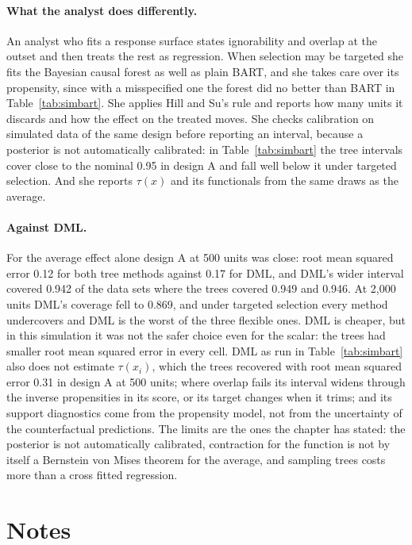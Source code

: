 \paragraph{What the analyst does differently.} An analyst who fits a response surface states ignorability and overlap at the outset and then treats the rest as regression. When selection may be targeted she fits the Bayesian causal forest as well as plain BART, and she takes care over its propensity, since with a misspecified one the forest did no better than BART in Table~\ref{tab:simbart}. She applies Hill and Su's rule and reports how many units it discards and how the effect on the treated moves. She checks calibration on simulated data of the same design before reporting an interval, because a posterior is not automatically calibrated: in Table~\ref{tab:simbart} the tree intervals cover close to the nominal 0.95 in design A and fall well below it under targeted selection. And she reports $\tau(x)$ and its functionals from the same draws as the average.

\paragraph{Against DML.} For the average effect alone design A at 500 units was close: root mean squared error 0.12 for both tree methods against 0.17 for DML, and DML's wider interval covered 0.942 of the data sets where the trees covered 0.949 and 0.946. At 2,000 units DML's coverage fell to 0.869, and under targeted selection every method undercovers and DML is the worst of the three flexible ones. DML is cheaper, but in this simulation it was not the safer choice even for the scalar: the trees had smaller root mean squared error in every cell. DML as run in Table~\ref{tab:simbart} also does not estimate $\tau(x_i)$, which the trees recovered with root mean squared error 0.31 in design A at 500 units; where overlap fails its interval widens through the inverse propensities in its score, or its target changes when it trims; and its support diagnostics come from the propensity model, not from the uncertainty of the counterfactual predictions. The limits are the ones the chapter has stated: the posterior is not automatically calibrated, contraction for the function is not by itself a Bernstein von Mises theorem for the average, and sampling trees costs more than a cross fitted regression.

\section*{Notes}

